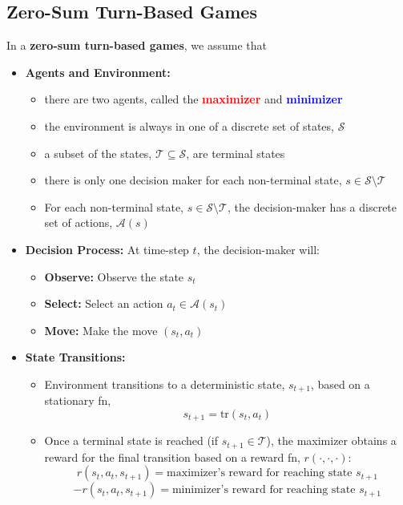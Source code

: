 \subsection{Zero-Sum Turn-Based Games}
\begin{summary}
    In a \textbf{zero-sum turn-based games}, we assume that 
    \begin{itemize}
        \item \textbf{Agents and Environment:} 
        \begin{itemize}
            \item there are two agents, called the \textcolor{red}{\textbf{maximizer}} and \textcolor{blue}{\textbf{minimizer}}
            \item the environment is always in one of a discrete set of states, $\mathcal{S}$
            \item a subset of the states, $\mathcal{T} \subseteq \mathcal{S}$, are terminal states
            \item there is only one decision maker for each non-terminal state, $s \in \mathcal{S} \setminus \mathcal{T}$
            \item For each non-terminal state, $s \in \mathcal{S} \setminus \mathcal{T}$, the decision-maker has a discrete set of actions, $\mathcal{A}(s)$
        \end{itemize}
        \item \textbf{Decision Process:} At time-step $t$, the decision-maker will: 
        \begin{itemize}
            \item \textbf{Observe:} Observe the state $s_t$ 
            \item \textbf{Select:} Select an action $a_t \in \mathcal{A}(s_t)$
            \item \textbf{Move:} Make the move $(s_t,a_t)$
        \end{itemize}
        \item \textbf{State Transitions:} 
        \begin{itemize}
            \item Environment transitions to a deterministic state, $s_{t+1}$, based on a stationary fn, 
            \begin{equation*}
                s_{t+1} = \text{tr}(s_t,a_t)
            \end{equation*}
            \item Once a terminal state is reached (if $s_{t+1} \in \mathcal{T}$), the maximizer obtains a reward for the final transition based on a reward fn, $r(\cdot,\cdot,\cdot)$:
            \begin{equation*}
                r(s_t,a_t,s_{t+1}) = \text{maximizer's reward for reaching state $s_{t+1}$}
            \end{equation*}
            \begin{equation*}
                - r(s_t,a_t,s_{t+1}) = \text{minimizer's reward for reaching state $s_{t+1}$}
            \end{equation*}
        \end{itemize}
    \end{itemize}
\end{summary}
\newpage

